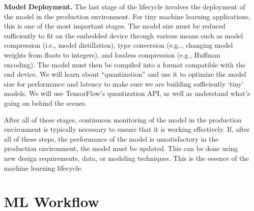 \textbf{Model Deployment.} The last stage of the lifecycle involves the deployment of the model in the production environment. For tiny machine learning applications, this is one of the most important stages. The model size must be reduced sufficiently to fit on the embedded device through various means such as model compression (i.e., model distillation), type conversion (e.g.., changing model weights from floats to integers), and lossless compression (e.g., Huffman encoding). The model must then be compiled into a format compatible with the end device. We will learn about “quantization” and use it to optimize the model size for performance and latency to make sure we are building sufficiently ‘tiny’ models. We will use TensorFlow’s quantization API, as well as understand what’s going on behind the scenes. 


\bigskip

After all of these stages, continuous monitoring of the model in the production environment is typically necessary to ensure that it is working effectively. If, after all of these steps, the performance of the model is unsatisfactory in the production environment, the model must be updated. This can be done using new design requirements, data, or modeling techniques. This is the essence of the machine learning lifecycle.

\section{ML Workflow}

